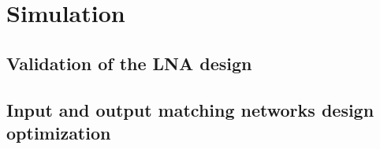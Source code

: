 \section{Simulation}

\subsection{Validation of the LNA design}

\subsection{Input and output matching networks design optimization} 